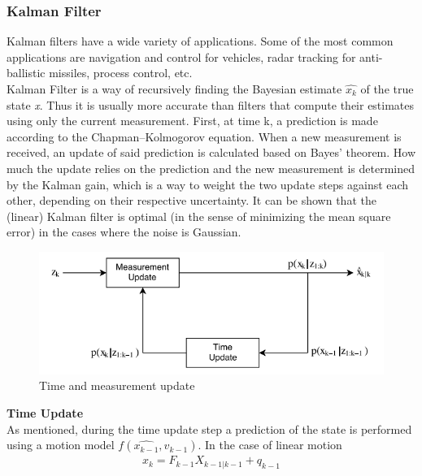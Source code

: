 \begin{itemize}
                    \subsubsection{Kalman Filter}
                        Kalman filters have a wide variety of applications. Some of the most common applications are navigation and control for vehicles, radar tracking for anti-ballistic missiles, process control, etc. \\
                        \vspace{3mm}
                        Kalman Filter is a way of recursively finding the Bayesian estimate $\hat{x_k}$ of the true state \emph{x}. Thus it is usually more accurate than filters that compute their estimates using only the current measurement. 
                        First, at time k, a prediction is made according to the Chapman–Kolmogorov equation. When a new measurement is received, an update of said prediction is calculated based on Bayes’ theorem. How much the update relies on 
                        the prediction and the new measurement is determined by the Kalman gain, which is a way to weight the two update steps against each other, depending on their respective uncertainty. It can be shown that the (linear) 
                        Kalman filter is optimal (in the sense of minimizing the mean square error) in the cases where the noise is Gaussian.
                        \begin{figure}[H]
                            \centering
                            \includegraphics[width=0.6\linewidth]{img/time-measurement.png}
                            \caption{Time and measurement update}
                        \end{figure}
                             \textbf{Time Update} \\ 
                                \vspace{3mm}
                                As mentioned, during the time update step a prediction of the state is performed using a motion model \emph{$f(\hat{x_{k-1}}, v_{k-1})$}. In the case of linear motion 
                                \begin{align}
                                    x_k = F_{k-1} X_{k-1 | k-1} + q_{k-1}

\end{align}
\end{itemize}
